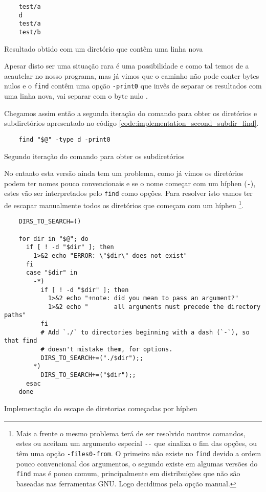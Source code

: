 \begin{listing}[H]
	\centering
	\begin{verbatim}
    test/a
    d
    test/a
    test/b
  \end{verbatim}
	\caption{Resultado obtido com um diretório que contêm uma linha nova}
\end{listing}

Apesar disto ser uma situação rara é uma possibilidade e como tal temos de a
acautelar no nosso programa, mas já vimos que o caminho não pode conter bytes
nulos e o \Verb|find| contêm uma opção \Verb|-print0| que invês de separar os
resultados com uma linha nova, vai separar com o byte nulo \cite{find_man}.

Chegamos assim então a segunda iteração do comando para obter os diretórios e
subdiretórios apresentado no código \ref{code:implementation_second_subdir_find}.

\begin{listing}[H]
	\centering
	\begin{verbatim}
    find "$@" -type d -print0
  \end{verbatim}
	\caption{Segundo iteração do comando para obter os subdiretórios}
	\label{code:implementation_second_subdir_find}
\end{listing}

No entanto esta versão ainda tem um problema, como já vimos os diretórios podem
ter nomes pouco convencionais e se o nome começar com um híphen (\Verb|-|),
estes vão ser interpretados pelo \Verb|find| como opções. Para resolver isto
vamos ter de escapar manualmente todos os diretórios que começam com um híphen
\footnote{Mais a frente o mesmo problema terá de ser resolvido noutros comandos,
	estes ou aceitam um argumento especial \Verb|--| que sinaliza o fim das opções,
	ou têm uma opção \Verb|-files0-from|. O primeiro não existe no \Verb|find|
	devido a ordem pouco convencional dos argumentos, o segundo existe em algumas
	versões do \Verb|find| mas é pouco comum, principalmente em distribuições que
	não são baseadas nas ferramentas GNU. Logo decidimos pela opção manual.}.

\begin{listing}[H]
	\centering
	\begin{verbatim}
    DIRS_TO_SEARCH=()

    for dir in "$@"; do
      if [ ! -d "$dir" ]; then
        1>&2 echo "ERROR: \"$dir\" does not exist"
      fi
      case "$dir" in
        -*)
          if [ ! -d "$dir" ]; then
            1>&2 echo "+note: did you mean to pass an argument?"
            1>&2 echo "       all arguments must precede the directory paths"
          fi
          # Add `./` to directories beginning with a dash (`-`), so that find
          # doesn't mistake them, for options.
          DIRS_TO_SEARCH+=("./$dir");;
        *)
          DIRS_TO_SEARCH+=("$dir");;
      esac
    done
  \end{verbatim}
	\caption{Implementação do escape de diretorias começadas por híphen}
	\label{code:implementation_escape_options_find}
\end{listing}

